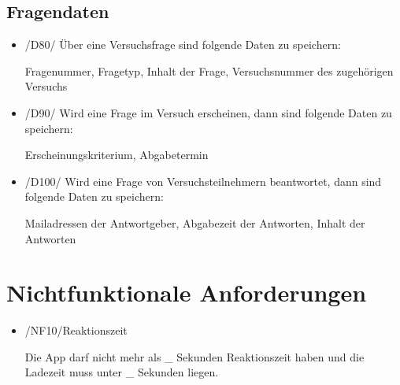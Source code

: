 \documentclass[a4paper]{scrreprt}
\begin{document}
        \section{Fragendaten}
            \begin{itemize}
                \item /D80/ Über eine Versuchsfrage sind folgende Daten zu speichern:
                    \par Fragenummer, Fragetyp, Inhalt der Frage, Versuchsnummer des zugehörigen Versuchs
                    
                \item /D90/ Wird eine Frage im Versuch erscheinen, dann sind folgende Daten zu speichern:
                    \par Erscheinungskriterium, Abgabetermin
                    
                \item /D100/ Wird eine Frage von Versuchsteilnehmern beantwortet, dann sind folgende Daten zu speichern:
                    \par Mailadressen der Antwortgeber, Abgabezeit der Antworten, Inhalt der Antworten
            \end{itemize}
 
   \chapter{Nichtfunktionale Anforderungen}
        \begin{itemize}
            \item /NF10/Reaktionszeit

            	\par Die App darf nicht mehr als \_ Sekunden Reaktionszeit haben und die Ladezeit muss unter \_ Sekunden liegen.

                
        \end{itemize}
 
\end{document}

